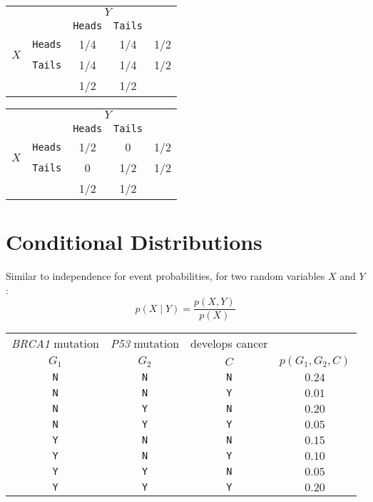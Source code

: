 \begin{center}
\begin{tabular}{cr||c|c|c}
	&& \multicolumn{2}{c|}{$Y$}\\
	&& \texttt{Heads} & \texttt{Tails}\\
\hline\hline
\multirow{2}{*}{$X$} & \texttt{Heads}	& 1/4		& 1/4		& 1/2\\
\cline{3-4}
			& \texttt{Tails}	&	1/4	& 1/4		& 1/2\\
\hline
			&			&	1/2	& 1/2\\
\end{tabular}\hspace{3em}
%
\begin{tabular}{cr||c|c|c}
	&& \multicolumn{2}{c|}{$Y$}\\
	&& \texttt{Heads} & \texttt{Tails}\\
\hline\hline
\multirow{2}{*}{$X$} & \texttt{Heads}	& 1/2		& 0		& 1/2\\
\cline{3-4}
			& \texttt{Tails}	&	0	& 1/2		& 1/2\\
\hline
			&			&	1/2	& 1/2\\
\end{tabular}
\end{center}



\section{Conditional Distributions}
Similar to independence for event probabilities, for two random variables $X$ and $Y$ :
\[p(X\mid Y) = \frac{p(X,Y)}{p(X)}\]

\begin{center}
\begin{tabular}{c|c|c|c}
\textit{BRCA1} mutation & \textit{P53} mutation & develops cancer \\
$G_1$ & $G_2$ & $C$& $p(G_1,G_2,C)$\\
\hline\hline
\texttt{N}& \texttt{N}& \texttt{N}& $0.24$\\
\texttt{N}& \texttt{N}& \texttt{Y}& $0.01$\\
\texttt{N}& \texttt{Y}& \texttt{N}& $0.20$\\
\texttt{N}& \texttt{Y}& \texttt{Y}& $0.05$\\
\texttt{Y}& \texttt{N}& \texttt{N}& $0.15$\\
\texttt{Y}& \texttt{N}& \texttt{Y}& $0.10$\\
\texttt{Y}& \texttt{Y}& \texttt{N}& $0.05$\\
\texttt{Y}& \texttt{Y}& \texttt{Y}& $0.20$\\
\end{tabular}
\end{center}

